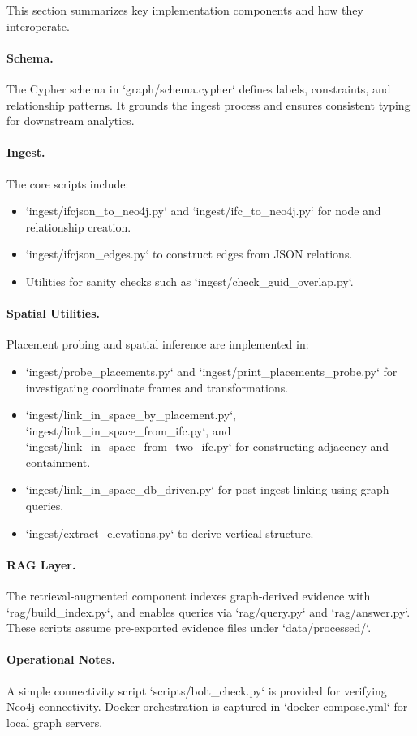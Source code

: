 This section summarizes key implementation components and how they interoperate.

\paragraph{Schema.} The Cypher schema in `graph/schema.cypher` defines labels, constraints, and relationship patterns. It grounds the ingest process and ensures consistent typing for downstream analytics.

\paragraph{Ingest.} The core scripts include:
\begin{itemize}[leftmargin=*]
  \item `ingest/ifcjson_to_neo4j.py` and `ingest/ifc_to_neo4j.py` for node and relationship creation.
  \item `ingest/ifcjson_edges.py` to construct edges from JSON relations.
  \item Utilities for sanity checks such as `ingest/check_guid_overlap.py`.
\end{itemize}

\paragraph{Spatial Utilities.} Placement probing and spatial inference are implemented in:
\begin{itemize}[leftmargin=*]
  \item `ingest/probe_placements.py` and `ingest/print_placements_probe.py` for investigating coordinate frames and transformations.
  \item `ingest/link_in_space_by_placement.py`, `ingest/link_in_space_from_ifc.py`, and `ingest/link_in_space_from_two_ifc.py` for constructing adjacency and containment.
  \item `ingest/link_in_space_db_driven.py` for post-ingest linking using graph queries.
  \item `ingest/extract_elevations.py` to derive vertical structure.
\end{itemize}

\paragraph{RAG Layer.} The retrieval-augmented component indexes graph-derived evidence with `rag/build_index.py`, and enables queries via `rag/query.py` and `rag/answer.py`. These scripts assume pre-exported evidence files under `data/processed/`.

\paragraph{Operational Notes.} A simple connectivity script `scripts/bolt_check.py` is provided for verifying Neo4j connectivity. Docker orchestration is captured in `docker-compose.yml` for local graph servers.

